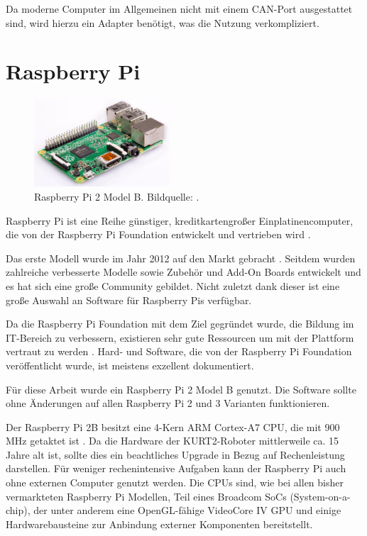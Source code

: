 \documentclass[german]{thesis_KBS}
\begin{document}
Da moderne Computer im Allgemeinen nicht mit einem CAN-Port ausgestattet sind,
wird hierzu ein Adapter benötigt, was die Nutzung verkompliziert.


\section{Raspberry Pi}

\begin{figure}
    \vspace{-8pt}
    \centering \includegraphics[width=0.45\textwidth]{Pi.png}
    \caption{Raspberry Pi 2 Model B. Bildquelle: \cite{raspi2b}.}
    \label{fig:raspi}
\end{figure}

Raspberry Pi ist eine Reihe günstiger, kreditkartengroßer Einplatinencomputer,
die von der Raspberry Pi Foundation entwickelt und vertrieben wird
\cite{raspi-web}.

Das erste Modell wurde im Jahr 2012 auf den Markt gebracht \cite{raspi-launch}.
Seitdem wurden zahlreiche verbesserte Modelle sowie Zubehör und Add-On Boards
entwickelt und es hat sich eine große Community gebildet. Nicht zuletzt dank
dieser ist eine große Auswahl an Software für Raspberry Pis verfügbar.

Da die Raspberry Pi Foundation mit dem Ziel gegründet wurde, die Bildung im
IT-Bereich zu verbessern, existieren sehr gute Ressourcen um mit der Plattform
vertraut zu werden \cite{raspi-strategy} \cite{raspi-docs}. Hard- und Software,
die von der Raspberry Pi Foundation veröffentlicht wurde, ist meistens exzellent
dokumentiert.

Für diese Arbeit wurde ein Raspberry Pi 2 Model B genutzt. Die
Software sollte ohne Änderungen auf allen Raspberry Pi 2 und 3 Varianten
funktionieren.

Der Raspberry Pi 2B besitzt eine 4-Kern ARM Cortex-A7 CPU, die mit 900 MHz
getaktet ist \cite{raspi2b}. Da die Hardware der KURT2-Roboter mittlerweile ca.
15 Jahre alt ist, sollte dies ein beachtliches Upgrade in Bezug auf
Rechenleistung darstellen. Für weniger rechenintensive Aufgaben kann der
Raspberry Pi auch ohne externen Computer genutzt werden. Die CPUs sind, wie bei
allen bisher vermarkteten Raspberry Pi Modellen, Teil eines Broadcom SoCs
(System-on-a-chip), der unter anderem eine OpenGL-fähige VideoCore IV GPU und
einige Hardwarebausteine zur Anbindung externer Komponenten bereitstellt.
\end{document}
